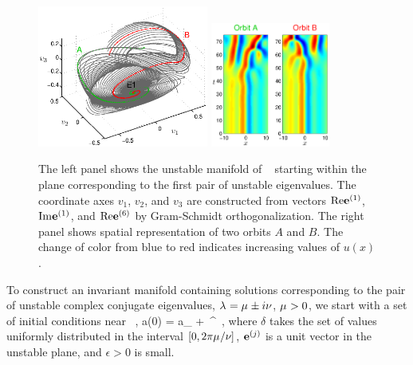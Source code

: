 \begin{figure}[t]
\begin{center}
\includegraphics[width=0.5\textwidth]{figs/ks22_E1_plane1_manifold.eps}
\includegraphics[width=0.35\textwidth]{figs/ks22_E1_plane1_orbits.eps}
\end{center}
\caption{
The left panel shows the unstable
manifold of \eqv\  starting within the plane
corresponding to the first pair of unstable eigenvalues. The
coordinate axes $v_1$, $v_2$, and $v_3$ are constructed from vectors
$\mathrm{Re} {\mathbf e}^{(1)}$, $\mathrm{Im} {\mathbf e}^{(1)}$, 
and $\mathrm{Re} {\mathbf e}^{(6)}$
by Gram-Schmidt orthogonalization.
The right panel shows spatial representation of two orbits $A$ and $B$.
The change of color from blue to red indicates increasing values of
$u(x)$.}
\label{f:KS22E1man1}
\end{figure}

To construct an invariant manifold containing solutions
corresponding to the pair of unstable complex conjugate eigenvalues,
$\lambda_{ }= \mu_{ } \pm i\nu_{ }$,
$\mu_{ } > 0$, we start with a set of
initial conditions near \eqv\ ,
\beq
  a(0) = a_{{}} + \epsilon\,^{\delta}
\,,
where $\delta$ takes the set of values uniformly distributed in the
interval $[0,2\pi\mu_{ }/\nu_{ }]$, ${\mathbf e}^{(j)}$ is a unit vector in the
unstable plane, and $\epsilon > 0$ is small.

